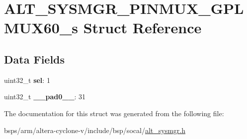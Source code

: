 \hypertarget{structALT__SYSMGR__PINMUX__GPLMUX60__s}{}\section{A\+L\+T\+\_\+\+S\+Y\+S\+M\+G\+R\+\_\+\+P\+I\+N\+M\+U\+X\+\_\+\+G\+P\+L\+M\+U\+X60\+\_\+s Struct Reference}
\label{structALT__SYSMGR__PINMUX__GPLMUX60__s}
\subsection*{Data Fields}
\begin{DoxyCompactItemize}
\item 
\mbox{\label{structALT__SYSMGR__PINMUX__GPLMUX60__s_a54ef5b6ad7ecd2fa049affdd42bb3f0b}} 
uint32\+\_\+t {\bfseries sel}\+: 1
\item 
\mbox{\label{structALT__SYSMGR__PINMUX__GPLMUX60__s_a90ca9865b88c4a34a1e8e2ad67af21ad}} 
uint32\+\_\+t {\bfseries \+\_\+\+\_\+pad0\+\_\+\+\_\+}\+: 31
\end{DoxyCompactItemize}


The documentation for this struct was generated from the following file\+:\begin{DoxyCompactItemize}
\item 
bsps/arm/altera-\/cyclone-\/v/include/bsp/socal/\mbox{\hyperlink{alt__sysmgr_8h}{alt\+\_\+sysmgr.\+h}}\end{DoxyCompactItemize}
